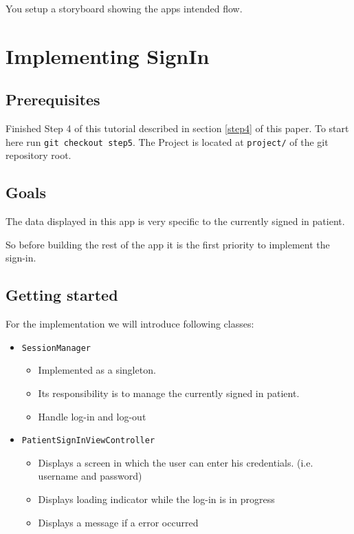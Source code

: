 \documentclass{article}
\begin{document}
You setup a storyboard showing the apps intended flow.

\section{Implementing SignIn}\label{step5}

\subsection{Prerequisites}\label{step5:prerequisites}
Finished Step 4 of this tutorial described in section \ref{step4} of this paper.
To start here run \texttt{git checkout step5}.
The Project is located at \texttt{project/} of the git repository root.

\subsection{Goals}\label{step5:goals}

The data displayed in this app is very specific to the currently signed
in patient.

So before building the rest of the app it is the first priority to
implement the sign-in.

\subsection{Getting started}\label{step5:getting-started}

For the implementation we will introduce following classes:

\begin{itemize}

\item
  \texttt{SessionManager}
    \begin{itemize}

    \item
      Implemented as a singleton.
    \item
      Its responsibility is to manage the currently signed in patient.
    \item
      Handle log-in and log-out
    \end{itemize}

\item
  \texttt{PatientSignInViewController}
    \begin{itemize}

    \item
      Displays a screen in which the user can enter his credentials.
      (i.e. username and password)
    \item
      Displays loading indicator while the log-in is in progress
    \item
      Displays a message if a error occurred
    \end{itemize}
\end{itemize}
\end{document}
